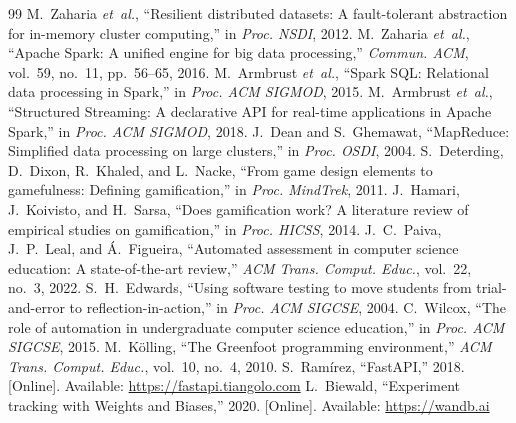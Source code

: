 \documentclass[10pt,twocolumn,letterpaper]{article}
\begin{document}
\begin{thebibliography}{99}
\small
{} M.~Zaharia \emph{et~al.}, ``Resilient distributed datasets:
A fault-tolerant abstraction for in-memory cluster computing,'' in \emph{Proc.
NSDI}, 2012.
 M.~Zaharia \emph{et~al.}, ``Apache Spark: A unified
engine for big data processing,'' \emph{Commun. ACM}, vol.~59, no.~11, pp.~56--65,
2016.
 M.~Armbrust \emph{et~al.}, ``Spark SQL: Relational
data processing in Spark,'' in \emph{Proc. ACM SIGMOD}, 2015.
 M.~Armbrust \emph{et~al.}, ``Structured Streaming: A
declarative API for real-time applications in Apache Spark,'' in \emph{Proc. ACM
SIGMOD}, 2018.
 J.~Dean and S.~Ghemawat, ``MapReduce: Simplified data
processing on large clusters,'' in \emph{Proc. OSDI}, 2004.
 S.~Deterding, D.~Dixon, R.~Khaled, and
L.~Nacke, ``From game design elements to gamefulness: Defining gamification,'' in
\emph{Proc. MindTrek}, 2011.
 J.~Hamari, J.~Koivisto, and H.~Sarsa, ``Does
gamification work? A literature review of empirical studies on gamification,'' in
\emph{Proc. HICSS}, 2014.
 J.~C.~Paiva, J.~P.~Leal, and \'A.~Figueira,
``Automated assessment in computer science education: A state-of-the-art review,''
\emph{ACM Trans. Comput. Educ.}, vol.~22, no.~3, 2022.
 S.~H.~Edwards, ``Using software testing to move
students from trial-and-error to reflection-in-action,'' in \emph{Proc. ACM
SIGCSE}, 2004.
 C.~Wilcox, ``The role of automation in undergraduate
computer science education,'' in \emph{Proc. ACM SIGCSE}, 2015.
 M.~K\"olling, ``The Greenfoot programming
environment,'' \emph{ACM Trans. Comput. Educ.}, vol.~10, no.~4, 2010.
 S.~Ram\'irez, ``FastAPI,'' 2018. [Online]. Available:
\url{https://fastapi.tiangolo.com}
 L.~Biewald, ``Experiment tracking with Weights and
Biases,'' 2020. [Online]. Available: \url{https://wandb.ai}
\end{thebibliography}
\end{document}
